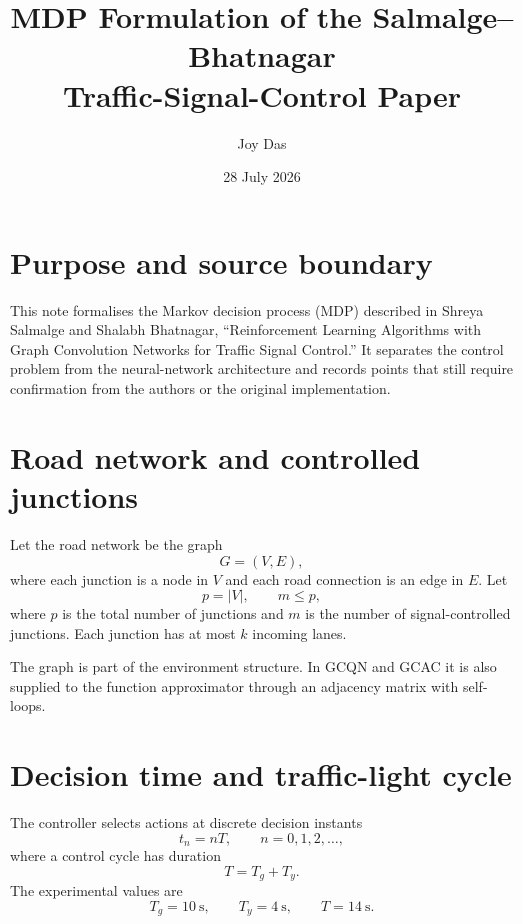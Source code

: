 \documentclass[11pt]{article}
\title{MDP Formulation of the Salmalge--Bhatnagar\\Traffic-Signal-Control Paper}
\author{Joy Das}
\date{28 July 2026}
\begin{document}
\maketitle
\tableofcontents
\newpage

\section{Purpose and source boundary}

This note formalises the Markov decision process (MDP) described in Shreya Salmalge and Shalabh Bhatnagar, ``Reinforcement Learning Algorithms with Graph Convolution Networks for Traffic Signal Control.'' It separates the control problem from the neural-network architecture and records points that still require confirmation from the authors or the original implementation.

\section{Road network and controlled junctions}

Let the road network be the graph
\begin{equation}
G=(V,E),
\end{equation}
where each junction is a node in $V$ and each road connection is an edge in $E$. Let
\begin{equation}
p=|V|, \qquad m\leq p,
\end{equation}
where $p$ is the total number of junctions and $m$ is the number of signal-controlled junctions. Each junction has at most $k$ incoming lanes.

The graph is part of the environment structure. In GCQN and GCAC it is also supplied to the function approximator through an adjacency matrix with self-loops.

\section{Decision time and traffic-light cycle}

The controller selects actions at discrete decision instants
\begin{equation}
t_n=nT, \qquad n=0,1,2,\ldots,
\end{equation}
where a control cycle has duration
\begin{equation}
T=T_g+T_y.
\end{equation}
The experimental values are
\begin{equation}
T_g=10\ \text{s}, \qquad T_y=4\ \text{s}, \qquad T=14\ \text{s}.
\end{equation}
\end{document}
